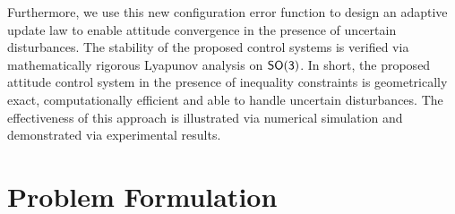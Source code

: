 \documentclass[fleqn]{IJCAS}  %
\begin{document}
\begin{multicols}{2}
Furthermore, we use this new configuration error function to design an adaptive update law to enable attitude convergence in the presence of uncertain disturbances. 
The stability of the proposed control systems is verified via mathematically rigorous Lyapunov analysis on $\mathsf{SO(3)}$.  
In short, the proposed attitude control system in the presence of inequality constraints is geometrically exact, computationally efficient and able to handle uncertain disturbances. 
The effectiveness of this approach is illustrated via numerical simulation and demonstrated via experimental results.%

\section{Problem Formulation}\label{sec:prob_form}

\end{multicols}
\end{document}
